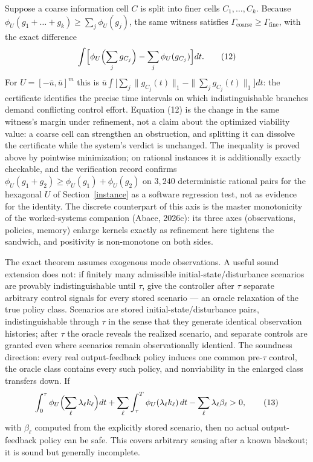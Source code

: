 \documentclass[10pt,twocolumn]{article}
\theoremstyle{plain}
\theoremstyle{definition}
\theoremstyle{remark}
\begin{document}
Suppose a coarse information cell \(C\) is split into finer cells
\(C_1,\dots,C_k\). Because
\(\phi_U(g_1 + \dots + g_k) \ge \sum_j \phi_U(g_j)\), the same witness
satisfies \(\Gamma_{\mathrm{coarse}} \ge \Gamma_{\mathrm{fine}}\), with the
exact difference
\[
\int \Bigl[ \phi_U\Bigl(\sum_j g_{C_j}\Bigr) - \sum_j \phi_U(g_{C_j}) \Bigr]
dt.
\tag{12}
\]
For \(U = [-\bar u, \bar u]^m\) this is
\(\bar u \int \bigl[\sum_j \|g_{C_j}(t)\|_1 - \|\sum_j g_{C_j}(t)\|_1\bigr] dt\):
the certificate identifies the precise time intervals on which
indistinguishable branches demand conflicting control effort. Equation (12)
is the change in the same witness's margin under refinement, not a claim
about the optimized viability value: a coarse cell can strengthen an
obstruction, and splitting it can dissolve the certificate while the
system's verdict is unchanged. The inequality is proved above by pointwise minimization; on rational
instances it is additionally exactly checkable, and the verification record
confirms \(\phi_U(g_1 + g_2) \ge \phi_U(g_1) + \phi_U(g_2)\) on
\(3{,}240\) deterministic rational pairs for the hexagonal \(U\) of
Section~\ref{instance} as a software regression test, not as evidence for
the identity. The discrete counterpart of this axis is the master
monotonicity of the worked-systems companion (Abaee, 2026c): its three
axes (observations, policies, memory) enlarge kernels exactly as
refinement here tightens the sandwich, and positivity is non-monotone on
both sides.

The exact theorem assumes exogenous mode observations. A useful sound
extension does not: if finitely many admissible initial-state/disturbance
scenarios are provably indistinguishable until \(\tau\), give the controller
after \(\tau\) separate arbitrary control signals for every stored scenario
--- an oracle relaxation of the true policy class. Scenarios are stored
initial-state/disturbance pairs, indistinguishable through \(\tau\) in
the sense that they generate identical observation histories; after
\(\tau\) the oracle reveals the realized scenario, and separate controls
are granted even where scenarios remain observationally identical. The
soundness direction: every real output-feedback policy induces one common
pre-\(\tau\) control, the oracle class contains every such policy, and
nonviability in the enlarged class transfers down. If
\[
\int_0^\tau \phi_U\Bigl(\sum_\ell \lambda_\ell k_\ell\Bigr) dt
+ \sum_\ell \int_\tau^T \phi_U(\lambda_\ell k_\ell)\, dt
- \sum_\ell \lambda_\ell \beta_\ell > 0,
\tag{13}
\]
with \(\beta_\ell\) computed from the explicitly stored scenario, then no
actual output-feedback policy can be safe. This covers arbitrary sensing
after a known blackout; it is sound but generally incomplete.
\end{document}
